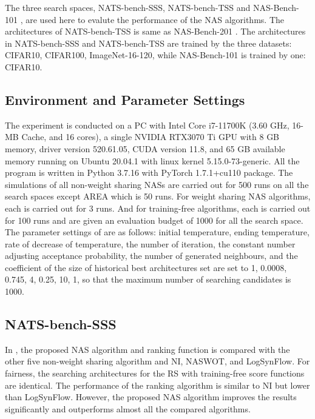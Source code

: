 \documentclass[sigconf]{acmart}
\begin{document}
    The three search spaces, NATS-bench-SSS, NATS-bench-TSS 
    \cite{Dong_2021} and NAS-Bench-101 \cite{ying2019nasbench101}, are used 
    here to evalute the performance of the NAS algorithms. The architectures 
    of NATS-bench-TSS is same as NAS-Bench-201 \cite{dong2020nasbench201}. 
    The architectures in NATS-bench-SSS and NATS-bench-TSS are trained by the three datasets: 
    CIFAR10, CIFAR100, ImageNet-16-120, while NAS-Bench-101 is trained by one: 
    CIFAR10. 

    \subsection{Environment and Parameter Settings}
    The experiment is conducted on a PC with Intel Core i7-11700K (3.60 GHz, 16-MB Cache, and 16 cores), 
    a single NVIDIA RTX3070 Ti GPU with 8 GB memory, driver version 520.61.05, CUDA version 11.8, and 
    65 GB available memory running on Ubuntu 20.04.1 with linux kernel 5.15.0-73-generic. All the program 
    is written in Python 3.7.16 with PyTorch 1.7.1+cu110 package. The simulations of all 
    non-weight sharing NASs are carried out for 500 runs on all the search spaces except AREA which is 50 runs. 
    For weight sharing NAS algorithms, each is carried out for 3 runs. And for training-free 
    algorithms, each is carried out for 100 runs and are given an evaluation 
    budget of 1000 for all the search space. The parameter settings of \palg{} are as follows: 
    initial temperature, ending temperature, rate of decrease of temperature, the number of iteration, 
    the constant number adjusting acceptance probability, the number of generated neighbours, and 
    the coefficient of the size of historical best architectures set are set 
    to 1, 0.0008, 0.745, 4, 0.25, 10, 1, so that the maximum number of searching candidates is 1000. 

    \subsection{NATS-bench-SSS}
    In , the proposed NAS algorithm and ranking function is 
    compared with the other five non-weight sharing algorithm and NI, NASWOT, and LogSynFlow. 
    For fairness, the searching architectures for the RS with training-free score 
    functions are identical. The performance of the ranking algorithm is similar to NI but 
    lower than LogSynFlow. However, the proposed NAS algorithm improves the results 
    significantly and outperforms almost all the compared algorithms. 
\end{document}
